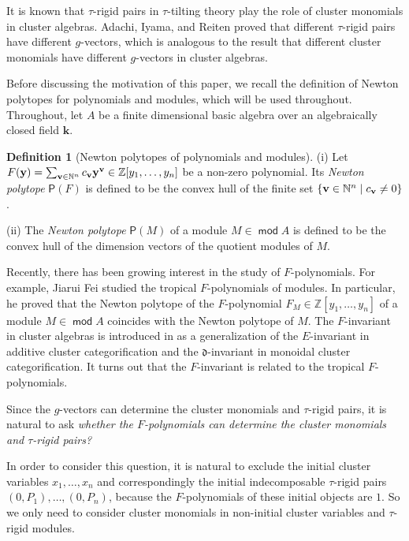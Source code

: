 \documentclass[10pt]{amsart}
\theoremstyle{definition}
\newtheorem{definition}[theorem]{Definition}
\theoremstyle{remark}
\numberwithin{equation}{section}
\def\mod{\opname{mod}\nolimits}
\newcommand{\opname}[1]{\operatorname{\mathsf{#1}}}
\begin{document}
It is known that $\tau$-rigid pairs in $\tau$-tilting theory play the role of cluster monomials in cluster algebras. Adachi, Iyama, and Reiten \cite{air_2014} proved that different $\tau$-rigid pairs have different $g$-vectors, which is analogous to the result that different cluster monomials have different $g$-vectors in cluster algebras.

Before discussing the motivation of this paper, we recall the definition of Newton polytopes for polynomials and modules, which will be used throughout. Throughout, let $A$ be a finite dimensional basic algebra over an algebraically closed field $\mathbf{k}$.


\begin{definition}[Newton polytopes of polynomials and modules] \label{def:polytope}
(i) Let $F({\bf y})=\sum_{{\bf v}\in\mathbb N^n}c_{\bf v}{\bf y}^{\bf v}\in\mathbb Z[y_1,\ldots,y_n]$ be a non-zero polynomial. Its {\em Newton polytope} $\mathsf P(F)$ is defined to be the convex hull of the finite set $\{{\bf v}\in\mathbb N^n\mid c_{\bf v}\neq 0\}$.

(ii) The {\em Newton polytope} $\mathsf P(M)$ of a module $M\in\mod A$ is defined to be the convex hull of the dimension vectors of the quotient modules of $M$.
\end{definition}





Recently, there has been growing interest in the study of $F$-polynomials. For example, Jiarui Fei \cite{fei_2019a,fei_2019b} studied the tropical $F$-polynomials of modules. In particular, he proved that  the Newton polytope of the $F$-polynomial $F_M\in\mathbb Z[y_1,\ldots,y_n]$ of a module $M\in\mod A$ coincides with the Newton polytope of $M$.
The $F$-invariant in cluster algebras is introduced in \cite{Cao-2023} as a generalization of the $E$-invariant \cite{DWZ10} in additive cluster categorification and the $\mathfrak{d}$-invariant \cite{kkko-2018,kkop-2020} in monoidal cluster categorification. It turns out that the $F$-invariant is related to the tropical $F$-polynomials.



Since the $g$-vectors can determine the cluster monomials and $\tau$-rigid pairs, it is natural to ask {\em whether the $F$-polynomials can determine the cluster monomials and $\tau$-rigid pairs?} 

In order to consider this question, it is natural to exclude the initial cluster variables $x_1,\ldots,x_n$ and correspondingly the initial indecomposable $\tau$-rigid pairs $(0,P_1),\ldots,(0,P_n)$, because the $F$-polynomials of these initial objects are $1$. So we only need to consider cluster monomials in non-initial cluster variables and $\tau$-rigid modules.
\end{document}
